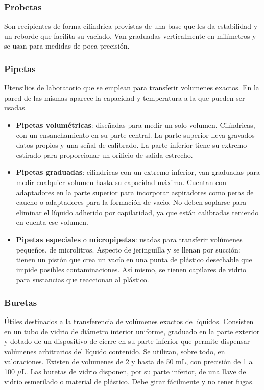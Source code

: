 \subsubsection{Probetas}
Son recipientes de forma cilíndrica provistas de una base que les da estabilidad y un reborde que facilita su vaciado. Van graduadas verticalmente en milímetros y se usan para medidas de poca precisión.
\subsubsection{Pipetas}
Utensilios de laboratorio que se emplean para transferir volumenes exactos. En la pared de las mismas aparece la capacidad y temperatura a la que pueden ser usadas.
\begin{itemize}[itemsep=0pt,parsep=0pt,topsep=0pt,partopsep=0pt]
    \item \textbf{Pipetas volumétricas}: diseñadas para medir un solo volumen. Cilíndricas, con un ensanchamiento en su parte central. La parte superior lleva gravados datos propios y una señal de calibrado. La parte inferior tiene su extremo estirado para proporcionar un orificio de salida estrecho.
    \item\textbf{Pipetas graduadas}: cilindricas con un extremo inferior, van graduadas para medir cualquier volumen hasta su capacidad máxima. Cuentan con adaptadores en la parte superior para incorporar aspiradores como peras de caucho o adaptadores para la formación de vacio. No deben soplarse para eliminar el líquido adherido por capilaridad, ya que están calibradas teniendo en cuenta ese volumen.
    \item\textbf{Pipetas especiales} o \textbf{micropipetas}: usadas para transferir volúmenes pequeños, de microlitros. Aspecto de jeringuilla y se llenan por succión: tienen un pistón que crea un vacío en una punta de plástico desechable que impide posibles contaminaciones. Así mismo, se tienen capilares de vidrio para sustancias que reaccionan al plástico.
\end{itemize}
\subsubsection{Buretas}
Útiles destinados a la transferencia de volúmenes exactos de líquidos. Consisten en un tubo de vidrio de diámetro interior uniforme, graduado en la parte exterior y dotado de un dispositivo de cierre en su parte inferior que permite dispensar volúmenes arbitrarios del líquido contenido. Se utilizan, sobre todo, en valoraciones. Existen de volumenes de 2 y hasta de 50 mL, con precisión de 1 a 100 $\mu$L. Las buretas de vidrio disponen, por su parte inferior, de una llave de vidrio esmerilado o material de plástico. Debe girar fácilmente y no tener fugas.

